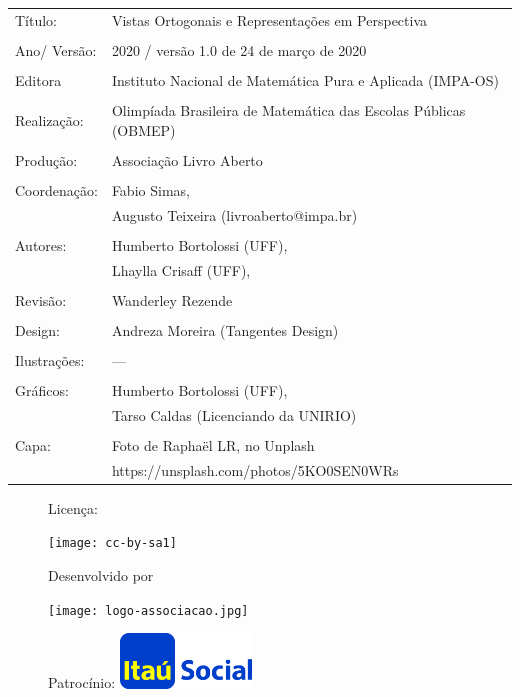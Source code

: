 \begin{tabular}{p{}p{}}
Título: & Vistas Ortogonais e Representações em Perspectiva\\
\\
Ano/ Versão: & 2020 / versão 1.0 de 24 de março de 2020\\
\\
Editora & Instituto Nacional de Matem\'atica Pura e Aplicada (IMPA-OS)\\
\\
Realização:& Olimp\'iada Brasileira de Matem\'atica das Escolas P\'ublicas (OBMEP)\\
\\
Produção:& Associação Livro Aberto\\
\\
Coordenação:& Fabio Simas, \\
            & Augusto Teixeira (livroaberto@impa.br)\\
\\
  Autores: & Humberto Bortolossi (UFF),\\
        & Lhaylla Crisaff (UFF),\\
             \\
Revisão: & Wanderley Rezende  \\
                
\\
Design: & Andreza Moreira (Tangentes Design) \\
\\
  Ilustrações: & --- \\ 
\\
Gráficos: & Humberto Bortolossi (UFF), \\
		      & Tarso Caldas (Licenciando da UNIRIO)\\

\\
  Capa: & Foto de Raphaël LR, no Unplash \\
  		& https://unsplash.com/photos/5KO0SEN0WRs \\

\end{tabular}

\begin{figure}[b]
\begin{minipage}[l]{5cm}
\centering

{\large Licença:}

  \texttt{[image: cc-by-sa1]}
\end{minipage}\hfill
\begin{minipage}[c]{5cm}
\centering
{\large Desenvolvido por}

\texttt{[image: logo-associacao.jpg]}
\end{minipage}
\begin{minipage}[r]{5cm}
\centering

{\large Patrocínio:}
  \vspace{1em}
  \includegraphics[width=3.5cm]{itau}
\end{minipage}
\end{figure}

